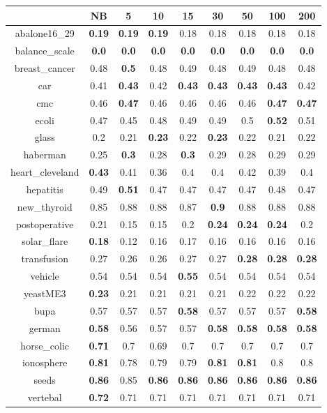 \documentclass{article}%
\begin{document}
\begin{tabular}{c|cccccccc}%
\hline%
&NB&5&10&15&30&50&100&200\\%
\hline%
abalone16\_29&\textbf{0.19}&\textbf{0.19}&\textbf{0.19}&0.18&0.18&0.18&0.18&0.18\\%
\hline%
balance\_scale&\textbf{0.0}&\textbf{0.0}&\textbf{0.0}&\textbf{0.0}&\textbf{0.0}&\textbf{0.0}&\textbf{0.0}&\textbf{0.0}\\%
\hline%
breast\_cancer&0.48&\textbf{0.5}&0.48&0.49&0.48&0.49&0.48&0.48\\%
\hline%
car&0.41&\textbf{0.43}&0.42&\textbf{0.43}&\textbf{0.43}&\textbf{0.43}&\textbf{0.43}&0.42\\%
\hline%
cmc&0.46&\textbf{0.47}&0.46&0.46&0.46&0.46&\textbf{0.47}&\textbf{0.47}\\%
\hline%
ecoli&0.47&0.45&0.48&0.49&0.49&0.5&\textbf{0.52}&0.51\\%
\hline%
glass&0.2&0.21&\textbf{0.23}&0.22&\textbf{0.23}&0.22&0.21&0.22\\%
\hline%
haberman&0.25&\textbf{0.3}&0.28&\textbf{0.3}&0.29&0.28&0.29&0.29\\%
\hline%
heart\_cleveland&\textbf{0.43}&0.41&0.36&0.4&0.4&0.42&0.39&0.4\\%
\hline%
hepatitis&0.49&\textbf{0.51}&0.47&0.47&0.47&0.47&0.48&0.47\\%
\hline%
new\_thyroid&0.85&0.88&0.88&0.87&\textbf{0.9}&0.88&0.88&0.88\\%
\hline%
postoperative&0.21&0.15&0.15&0.2&\textbf{0.24}&\textbf{0.24}&\textbf{0.24}&0.2\\%
\hline%
solar\_flare&\textbf{0.18}&0.12&0.16&0.17&0.16&0.16&0.16&0.16\\%
\hline%
transfusion&0.27&0.26&0.26&0.27&0.27&\textbf{0.28}&\textbf{0.28}&\textbf{0.28}\\%
\hline%
vehicle&0.54&0.54&0.54&\textbf{0.55}&0.54&0.54&0.54&0.54\\%
\hline%
yeastME3&\textbf{0.23}&0.21&0.21&0.21&0.21&0.22&0.22&0.22\\%
\hline%
bupa&0.57&0.57&0.57&\textbf{0.58}&0.57&0.57&0.57&\textbf{0.58}\\%
\hline%
german&\textbf{0.58}&0.56&0.57&0.57&\textbf{0.58}&\textbf{0.58}&\textbf{0.58}&\textbf{0.58}\\%
\hline%
horse\_colic&\textbf{0.71}&0.7&0.69&0.7&0.7&0.7&0.7&0.7\\%
\hline%
ionosphere&\textbf{0.81}&0.78&0.79&0.79&\textbf{0.81}&\textbf{0.81}&0.8&0.8\\%
\hline%
seeds&\textbf{0.86}&0.85&\textbf{0.86}&\textbf{0.86}&\textbf{0.86}&\textbf{0.86}&\textbf{0.86}&\textbf{0.86}\\%
\hline%
vertebal&\textbf{0.72}&0.71&0.71&0.71&0.71&0.71&0.71&0.71\\%
\hline%
\end{tabular}
\end{document}
